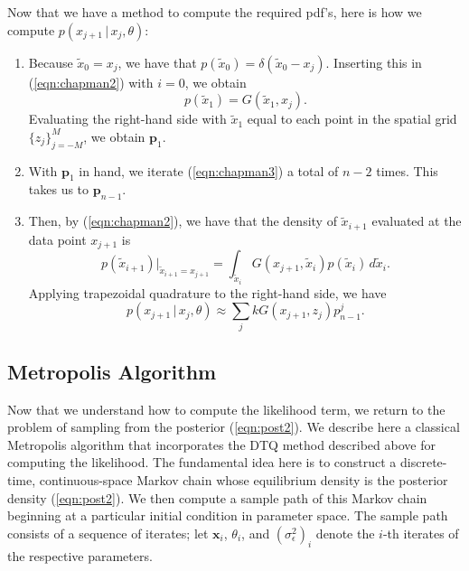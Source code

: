 \documentclass[wcp]{jmlr}
\begin{document}
Now that we have a method to compute the required pdf's, here is how
we compute $p(x_{j+1} \, | \, x_j, \theta)$:
\begin{enumerate}
\item Because $\tilde{x}_0 = x_j$, we have that $p(\tilde{x}_0) =
  \delta(\tilde{x}_0 - x_j)$.  Inserting this in
  (\ref{eqn:chapman2}) with $i=0$, we obtain
\begin{equation}
\label{eqn:DTQfirst}
p(\tilde{x}_1) = G(\tilde{x}_1,x_j).
\end{equation}
Evaluating the right-hand side with $\tilde{x}_1$ equal to each point
in the spatial grid $\{z_j\}_{j=-M}^{M}$, we obtain $\mathbf{p}_1$.
\item With $\mathbf{p}_1$ in hand, we iterate (\ref{eqn:chapman3}) a
  total of $n-2$ times.  This takes us to $\mathbf{p}_{n-1}$.
\item Then, by (\ref{eqn:chapman2}), we have that the density of
  $\tilde{x}_{i+1}$ evaluated at the data point $x_{j+1}$ is
$$
p(\tilde{x}_{i+1}) \biggr|_{\tilde{x}_{i+1} = x_{j+1}} =
\int_{\tilde{x}_i}  G(x_{j+1},\tilde{x}_i)  p(\tilde{x}_i)  \, d
\tilde{x}_i.$$
Applying trapezoidal quadrature to the right-hand side, we have
\begin{equation}
\label{eqn:DTQlast}
p(x_{j+1} \, | \, x_j, \theta) \approx \sum_j k G(x_{j+1},
z_j) p_{n-1}^j.
\end{equation}
\end{enumerate}

\subsection{Metropolis Algorithm}
\label{sect:metropolis}
Now that we understand how to compute the likelihood term, we return
to the problem of sampling from the posterior (\ref{eqn:post2}).  We
describe here a classical Metropolis algorithm that incorporates the
DTQ method described above for computing the likelihood.  The
fundamental idea here is to construct a discrete-time, continuous-space Markov chain
whose equilibrium density is the posterior density (\ref{eqn:post2}).
We then compute a sample path of this Markov chain beginning at a particular initial
condition in parameter space.  The sample path consists of a sequence
of iterates; let $\mathbf{x}_i$, $\theta_i$, and
$(\sigma_\epsilon^2)_i$ denote the $i$-th iterates of the respective
parameters.
\end{document}
